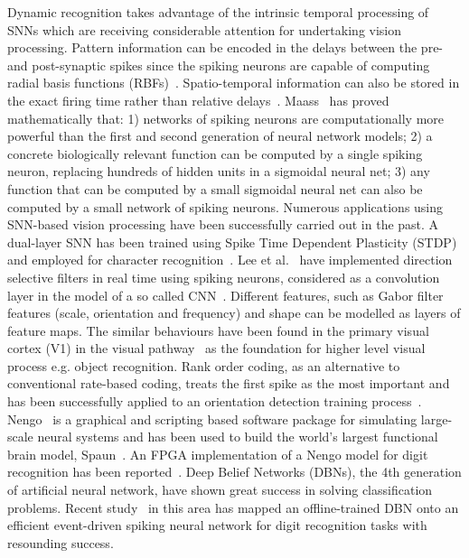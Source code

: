 Dynamic recognition takes advantage of the intrinsic temporal processing of SNNs which are receiving considerable attention for  undertaking vision processing.
Pattern information can be encoded in the delays between the pre- and post-synaptic spikes since the spiking neurons are capable of computing radial basis functions (RBFs)~\cite{hopfield1995pattern}.
Spatio-temporal information can also be stored in the exact firing time rather than relative delays~\cite{natschlager1998spatial}.
Maass~\cite{maass1997networks} has proved mathematically that:
1) networks of spiking neurons are computationally more powerful than the first and second generation of neural network models;
2) a concrete biologically relevant function can be computed by a single spiking neuron, replacing  hundreds of hidden units in a sigmoidal neural net;
3) any function that can be computed by a small sigmoidal neural net can also be computed by a small network of spiking neurons.
Numerous applications using SNN-based vision processing have been successfully carried out in the past. 
A dual-layer SNN has been trained using Spike Time Dependent Plasticity (STDP) and employed for character recognition~\cite{gupta2007character}. 
Lee et al.~\cite{6467270} have implemented direction selective filters in real time using spiking neurons, considered as a convolution layer in the model of a so called CNN~\cite{camunas2012event}. 
Different features, such as Gabor filter features (scale, orientation and frequency) and shape can be modelled as layers of feature maps. 
The similar behaviours have been found in the primary visual cortex (V1) in the visual pathway~\cite{rehn2007network} as the foundation for higher level visual process e.g. object recognition.
Rank order coding, as an alternative to conventional rate-based coding, treats the first spike as the most important and has been successfully applied to an orientation detection training process~\cite{delorme2001networks}. 
Nengo~\cite{eliasmith2011nengo} is a graphical and scripting based software package for simulating large-scale neural systems and has been used to build the world's largest functional brain model, Spaun~\cite{eliasmith2012large}. 
An FPGA implementation of a Nengo model for digit recognition has been reported~\cite{naylor2013managing}. 
Deep Belief Networks (DBNs), the 4th generation of artificial neural network, have shown great success in solving classification problems. 
Recent study~\cite{o2013real} in this area has mapped an offline-trained DBN onto an efficient event-driven spiking neural network for digit recognition tasks with resounding success.

